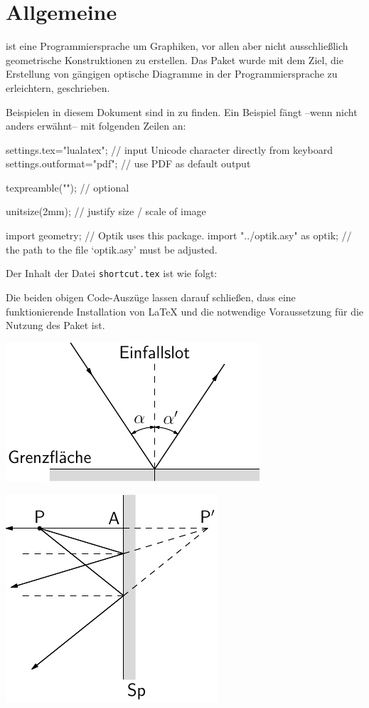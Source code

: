 \chapter{Allgemeine}

\asypmtote\cite{Asymptote} ist eine Programmiersprache um Graphiken, vor allen aber nicht ausschließlich geometrische Konstruktionen zu erstellen.
Das Paket \optik{} wurde mit dem Ziel, die Erstellung von gängigen optische Diagramme in der Programmiersprache \asypmtote{} zu erleichtern, geschrieben.


Beispielen in diesem Dokument sind in \repo{} zu finden. 
Ein Beispiel fängt --wenn nicht anders erwähnt-- mit folgenden Zeilen an:

\begin{asycode}
settings.tex="lualatex";  // input Unicode character directly from keyboard
settings.outformat="pdf"; // use PDF as default output

texpreamble(""); // optional

unitsize(2mm);                       // justify size / scale of image

import geometry;                     // Optik uses this package.
import "../optik.asy" as optik;      // the path to the file `optik.asy' must be adjusted.
\end{asycode}


Der Inhalt der Datei \verb|shortcut.tex| ist wie folgt:

\begin{texcode}
\newcommand{\pLabel}[1]{\mathsf{#1}}
\newcommand{\tLabel}[1]{\textsf{#1}}
\end{texcode}


Die beiden obigen Code-Auszüge lassen darauf schließen, 
dass eine funktionierende Installation von \LaTeX{} und \asypmtote{} die notwendige Voraussetzung für die Nutzung des Paket \optik{} ist.


\includegraphics{asy/demomirror}

\includegraphics{asy/demoverticalmirror}


